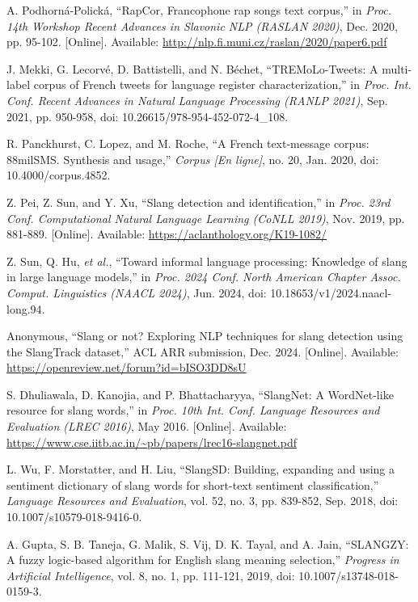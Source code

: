 \documentclass[12pt]{article}
\begin{document}
\begin{thebibliography}{99}
A. Podhorná-Polická, ``RapCor, Francophone rap songs text corpus,'' in \textit{Proc. 14th Workshop Recent Advances in Slavonic NLP (RASLAN 2020)}, Dec. 2020, pp. 95-102. [Online]. Available: \url{http://nlp.fi.muni.cz/raslan/2020/paper6.pdf}

J. Mekki, G. Lecorvé, D. Battistelli, and N. Béchet, ``TREMoLo-Tweets: A multi-label corpus of French tweets for language register characterization,'' in \textit{Proc. Int. Conf. Recent Advances in Natural Language Processing (RANLP 2021)}, Sep. 2021, pp. 950-958, doi: 10.26615/978-954-452-072-4\_108.

R. Panckhurst, C. Lopez, and M. Roche, ``A French text-message corpus: 88milSMS. Synthesis and usage,'' \textit{Corpus [En ligne]}, no. 20, Jan. 2020, doi: 10.4000/corpus.4852.

Z. Pei, Z. Sun, and Y. Xu, ``Slang detection and identification,'' in \textit{Proc. 23rd Conf. Computational Natural Language Learning (CoNLL 2019)}, Nov. 2019, pp. 881-889. [Online]. Available: \url{https://aclanthology.org/K19-1082/}

Z. Sun, Q. Hu, \textit{et al.}, ``Toward informal language processing: Knowledge of slang in large language models,'' in \textit{Proc. 2024 Conf. North American Chapter Assoc. Comput. Linguistics (NAACL 2024)}, Jun. 2024, doi: 10.18653/v1/2024.naacl-long.94.

Anonymous, ``Slang or not? Exploring NLP techniques for slang detection using the SlangTrack dataset,'' ACL ARR submission, Dec. 2024. [Online]. Available: \url{https://openreview.net/forum?id=bISO3DD8sU}

S. Dhuliawala, D. Kanojia, and P. Bhattacharyya, ``SlangNet: A WordNet-like resource for slang words,'' in \textit{Proc. 10th Int. Conf. Language Resources and Evaluation (LREC 2016)}, May 2016. [Online]. Available: \url{https://www.cse.iitb.ac.in/~pb/papers/lrec16-slangnet.pdf}

L. Wu, F. Morstatter, and H. Liu, ``SlangSD: Building, expanding and using a sentiment dictionary of slang words for short-text sentiment classification,'' \textit{Language Resources and Evaluation}, vol. 52, no. 3, pp. 839-852, Sep. 2018, doi: 10.1007/s10579-018-9416-0.

A. Gupta, S. B. Taneja, G. Malik, S. Vij, D. K. Tayal, and A. Jain, ``SLANGZY: A fuzzy logic-based algorithm for English slang meaning selection,'' \textit{Progress in Artificial Intelligence}, vol. 8, no. 1, pp. 111-121, 2019, doi: 10.1007/s13748-018-0159-3.


\end{thebibliography}
\end{document}
